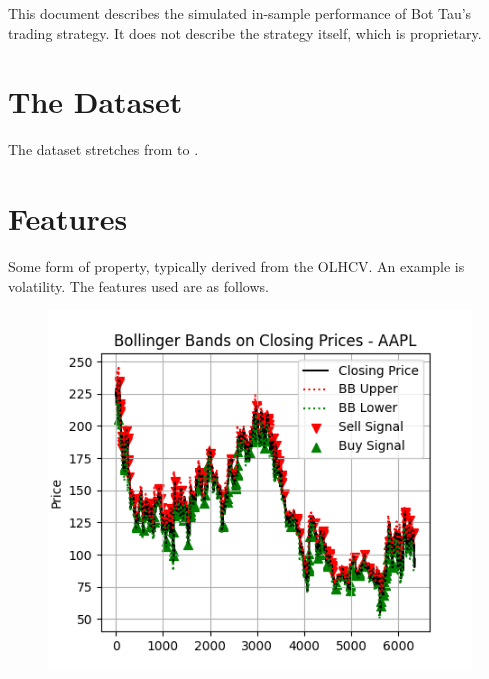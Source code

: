 \documentclass[a4paper]{article}
\title{\documenttitle}
\date{\today}
\author{Frans Englich \\
        \href{mailto:fenglich@fastmail.fm}{fenglich@fastmail.fm}}
\begin{document}
\maketitle

This document describes the simulated in-sample performance of Bot Tau's trading
strategy. It does not describe the strategy itself, which is proprietary.

\section{The Dataset}

The dataset stretches from \constantStartdate to \constantEnddate.

\section{Features}

Some form of property, typically derived from the OLHCV. An example is
volatility. The features used are as follows.

\begin{figure}[H]
    \begin{center}
        \includegraphics{../generated/feature_BollingerBands.png}
    \end{center}
\end{figure}
\end{document}
